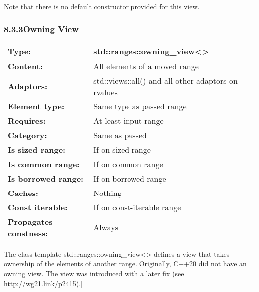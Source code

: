 Note that there is no default constructor provided for this view.

\subsubsection*{ 8.3.3\hspace{0.2cm}Owning View}

\begin{longtable}[c]{|l|l|}
\hline
\textbf{Type:}                 & std::ranges::owning\_view\textless{}\textgreater{}  \\ \hline
\endfirsthead
%
\endhead
%
\textbf{Content:}              & All elements of a moved range                       \\ \hline
\textbf{Adaptors:}             & std::views::all() and all other adaptors on rvalues \\ \hline
\textbf{Element type:}         & Same type as passed range                           \\ \hline
\textbf{Requires:}             & At least input range                                \\ \hline
\textbf{Category:}             & Same as passed                                      \\ \hline
\textbf{Is sized range:}       & If on sized range                                   \\ \hline
\textbf{Is common range:}      & If on common range                                  \\ \hline
\textbf{Is borrowed range:}    & If on borrowed range                                \\ \hline
\textbf{Caches:}               & Nothing                                             \\ \hline
\textbf{Const iterable:}       & If on const-iterable range                          \\ \hline
\textbf{Propagates constness:} & Always                                              \\ \hline
\end{longtable}

The class template std::ranges::owning\_view<> defines a view that takes ownership of the elements of another range.[Originally, C++20 did not have an owning view. The view was introduced with a later fix (see \url{http://wg21.link/p2415}).]


